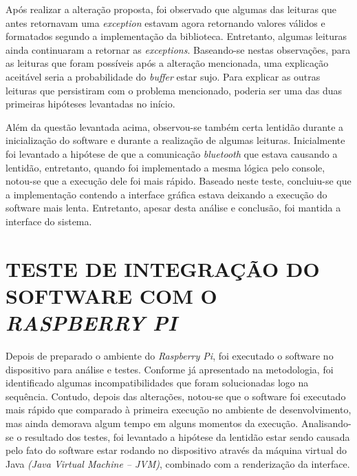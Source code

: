 Após realizar a alteração proposta, foi observado que algumas das leituras que antes retornavam uma \textit{exception} estavam agora retornando valores válidos e formatados segundo a implementação da biblioteca. Entretanto, algumas leituras ainda continuaram a retornar as \textit{exceptions}. Baseando-se nestas observações, para as leituras que foram possíveis após a alteração mencionada, uma explicação aceitável seria a probabilidade do \textit{buffer} estar sujo. Para explicar as outras leituras que persistiram com o problema mencionado, poderia ser uma das duas primeiras hipóteses levantadas no início.

Além da questão levantada acima, observou-se também certa lentidão durante a inicialização do software e durante a realização de algumas leituras. Inicialmente foi levantado a hipótese de que a comunicação \textit{bluetooth} que estava causando a lentidão, entretanto, quando foi implementado a mesma lógica pelo console, notou-se que a execução dele foi mais rápido. Baseado neste teste, concluiu-se que a implementação contendo a interface gráfica estava deixando a execução do software mais lenta. Entretanto, apesar desta análise e conclusão, foi mantida a interface do sistema.

\section{TESTE DE INTEGRAÇÃO DO SOFTWARE COM O \textit{RASPBERRY PI}}
Depois de preparado o ambiente do \textit{Raspberry Pi}, foi executado o software no dispositivo para análise e testes. Conforme já apresentado na metodologia, foi identificado algumas incompatibilidades que foram solucionadas logo na sequência. Contudo, depois das alterações, notou-se que o software foi executado mais rápido que comparado à primeira execução no ambiente de desenvolvimento, mas ainda demorava algum tempo em alguns momentos da execução. Analisando-se o resultado dos testes, foi levantado a hipótese da lentidão estar sendo causada pelo fato do software estar rodando no dispositivo através da máquina virtual do Java \textit{(Java Virtual Machine – JVM)}, combinado com a renderização da interface.

